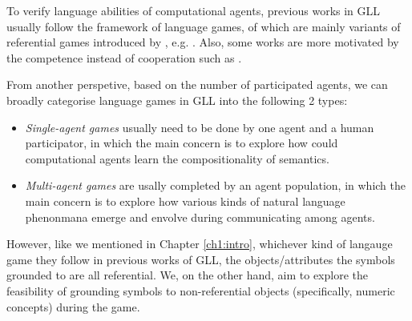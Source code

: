 To verify language abilities of computational agents, previous works in GLL usually follow the framework of language games, of which are mainly variants of referential games introduced by \cite{lewis2008convention}, e.g. \cite{hermann2017grounded, havrylov2017emergence}. Also, some works are more motivated by the competence instead of cooperation such as \cite{cao2018emergent}.

From another perspetive, based on the number of participated agents, we can broadly categorise language games in GLL into the following 2 types:
\begin{itemize}
  \item \textit{Single-agent games} usually need to be done by one agent and a human participator, in which the main concern is to explore how could computational agents learn the compositionality of semantics.
  \item \textit{Multi-agent games} are usally completed by an agent population, in which the main concern is to explore how various kinds of natural language phenonmana emerge and envolve during communicating among agents.
\end{itemize}

However, like we mentioned in Chapter \ref{ch1:intro}, whichever kind of langauge game they follow in previous works of GLL, the objects/attributes the symbols grounded to are all referential. We, on the other hand, aim to explore the feasibility of grounding symbols to non-referential objects (specifically, numeric concepts) during the game.